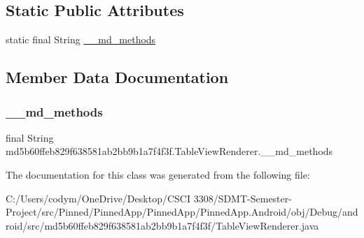 \subsection*{Static Public Attributes}
\begin{DoxyCompactItemize}
\item 
static final String \hyperlink{classmd5b60ffeb829f638581ab2bb9b1a7f4f3f_1_1_table_view_renderer_abfca855cef125ff9e66a6690bfef09b8}{\+\_\+\+\_\+md\+\_\+methods}
\end{DoxyCompactItemize}


\subsection{Member Data Documentation}
\mbox{\label{classmd5b60ffeb829f638581ab2bb9b1a7f4f3f_1_1_table_view_renderer_abfca855cef125ff9e66a6690bfef09b8}} 
\subsubsection{\texorpdfstring{\+\_\+\+\_\+md\+\_\+methods}{\_\_md\_methods}}
{\footnotesize\ttfamily final String md5b60ffeb829f638581ab2bb9b1a7f4f3f.\+Table\+View\+Renderer.\+\_\+\+\_\+md\+\_\+methods\hspace{0.3cm}{\ttfamily [static]}}



The documentation for this class was generated from the following file\+:\begin{DoxyCompactItemize}
\item 
C\+:/\+Users/codym/\+One\+Drive/\+Desktop/\+C\+S\+C\+I 3308/\+S\+D\+M\+T-\/\+Semester-\/\+Project/src/\+Pinned/\+Pinned\+App/\+Pinned\+App/\+Pinned\+App.\+Android/obj/\+Debug/android/src/md5b60ffeb829f638581ab2bb9b1a7f4f3f/Table\+View\+Renderer.\+java\end{DoxyCompactItemize}
